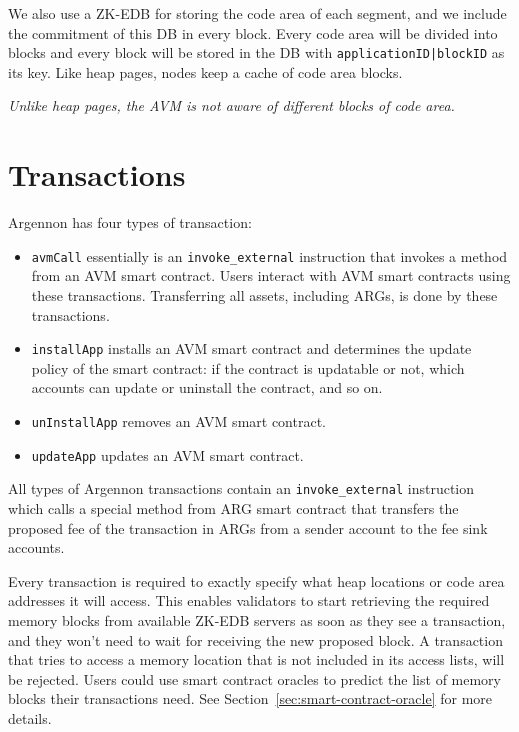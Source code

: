 \documentclass[11pt, a4paper]{report}
\newcommand{\note}[1] {
    \begin{tcolorbox}[colframe=white,colback=white]
        \emph{#1}
    \end{tcolorbox}
}
\begin{document}
    We also use a ZK-EDB for storing the code area of each segment, and we include the commitment of this DB in every
    block. Every code area will be divided into blocks and every block will be stored in the DB with
    \texttt{applicationID|blockID} as its key. Like heap pages, nodes keep a cache of code area blocks.

    \note{Unlike heap pages, the AVM is not aware of different blocks of code area.}


    \section{Transactions}\label{sec:transactions}

    Argennon has four types of transaction:

    \begin{itemize}
        \item \texttt{avmCall} essentially is an \texttt{invoke\_external} instruction that invokes a method from an
        AVM smart contract. Users interact with AVM smart contracts using these transactions. Transferring all
        assets, including ARGs, is done by these transactions.
        \item \texttt{installApp} installs an AVM smart contract and determines the update policy of the smart
        contract: if the contract is updatable or not, which accounts can update or uninstall the contract, and so
        on.
        \item \texttt{unInstallApp} removes an AVM smart contract.
        \item \texttt{updateApp} updates an AVM smart contract.
    \end{itemize}

    All types of Argennon transactions contain an \texttt{invoke\_external} instruction which calls a special method
    from ARG smart contract that transfers the proposed fee of the transaction in ARGs from a sender account to the
    fee sink accounts.

    Every transaction is required to exactly specify what heap locations or code area addresses it will access. This
    enables validators to start retrieving the required memory blocks from available ZK-EDB servers as soon as they
    see a transaction, and they won't need to wait for receiving the new proposed block. A transaction that tries to
    access a memory location that is not included in its access lists, will be rejected. Users could use smart contract
    oracles to predict the list of memory blocks their transactions need. See Section~\ref{sec:smart-contract-oracle}
    for more details.
\end{document}

